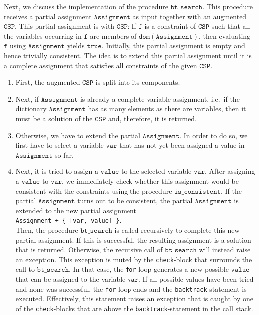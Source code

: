 Next, we discuss the implementation of the procedure $\texttt{bt\_search}$.  This procedure receives a partial assignment
$\texttt{Assignment}$ as input together with an augmented $\texttt{CSP}$.  This partial assignment is
 with $\texttt{CSP}$:  If $\texttt{f}$ is a constraint of $\texttt{CSP}$ such that
all the variables occurring in $\texttt{f}$ are members of $\texttt{dom}(\texttt{Assignment})$, then evaluating
$\texttt{f}$ using $\texttt{Assignment}$ yields $\texttt{true}$.  Initially, this partial assignment is empty
and hence trivially consistent.  The idea is to extend this partial assignment until it is a complete
assignment that satisfies all constraints of the given $\texttt{CSP}$.
\begin{enumerate}
\item First, the augmented $\texttt{CSP}$ is split into its components.
\item Next, if $\texttt{Assignment}$ is already a complete variable assignment, i.e.~if the dictionary
      $\texttt{Assignment}$ has as many elements as there are variables, then it must be a solution of
      the $\texttt{CSP}$ and, therefore, it is returned.
\item Otherwise, we have to extend the partial $\texttt{Assignment}$.  In order to do so, we first have to
      select a variable $\texttt{var}$ that has not yet been assigned a value in $\texttt{Assignment}$ so far.
\item Next, it is tried to assign a $\texttt{value}$ to the selected variable $\texttt{var}$.  After assigning
      a $\texttt{value}$ to $\texttt{var}$, we immediately check whether this assignment would be consistent
      with the constraints using the procedure $\texttt{is\_consistent}$.
      If the partial $\texttt{Assignment}$ turns out to be consistent, the partial $\texttt{Assignment}$
      is extended to the new partial assignment
      \\[0.2cm]
      \hspace*{1.3cm}
      \texttt{Assignment + \{ [var, value] \}}.
      \\[0.2cm]
      Then, the procedure $\texttt{bt\_search}$ is called recursively to complete this new partial assignment.
      If this is successful, the resulting assignment is a solution that is returned.  Otherwise,
      the recursive call of $\texttt{bt\_search}$ will instead raise an exception.  This exception is muted 
      by the \texttt{check}-block that surrounds the call to $\texttt{bt\_search}$.  In that case, the
      \texttt{for}-loop generates a new possible $\texttt{value}$ that can be assigned to the variable
      $\texttt{var}$.  If all possible values have been tried and none was successful, the \texttt{for}-loop
      ends and the \texttt{backtrack}-statement is executed.  Effectively, this statement raises an exception
      that is caught by one of the \texttt{check}-blocks that are above the \texttt{backtrack}-statement in the
      call stack.
\end{enumerate}



